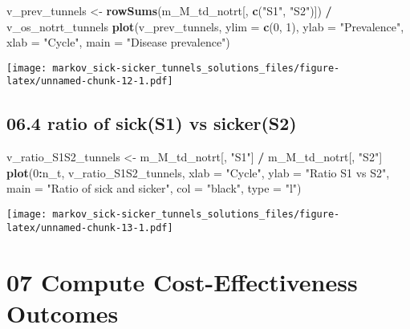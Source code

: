 \documentclass[
]{article}
\newenvironment{Shaded}{\begin{snugshade}}{\end{snugshade}}
\newcommand{\DataTypeTok}[1]{\textcolor[rgb]{0.13,0.29,0.53}{#1}}
\newcommand{\DecValTok}[1]{\textcolor[rgb]{0.00,0.00,0.81}{#1}}
\newcommand{\KeywordTok}[1]{\textcolor[rgb]{0.13,0.29,0.53}{\textbf{#1}}}
\newcommand{\NormalTok}[1]{#1}
\newcommand{\OperatorTok}[1]{\textcolor[rgb]{0.81,0.36,0.00}{\textbf{#1}}}
\newcommand{\StringTok}[1]{\textcolor[rgb]{0.31,0.60,0.02}{#1}}
\begin{document}
\begin{Shaded}
\begin{Highlighting}[]
\NormalTok{v_prev_tunnels <-}\StringTok{ }\KeywordTok{rowSums}\NormalTok{(m_M_td_notrt[, }\KeywordTok{c}\NormalTok{(}\StringTok{"S1"}\NormalTok{, }\StringTok{"S2"}\NormalTok{)]) }\OperatorTok{/}\StringTok{ }\NormalTok{v_os_notrt_tunnels}
\KeywordTok{plot}\NormalTok{(v_prev_tunnels,}
     \DataTypeTok{ylim =} \KeywordTok{c}\NormalTok{(}\DecValTok{0}\NormalTok{, }\DecValTok{1}\NormalTok{),}
     \DataTypeTok{ylab =} \StringTok{"Prevalence"}\NormalTok{,}
     \DataTypeTok{xlab =} \StringTok{"Cycle"}\NormalTok{,}
     \DataTypeTok{main =} \StringTok{"Disease prevalence"}\NormalTok{)}
\end{Highlighting}
\end{Shaded}

\texttt{[image: markov\_sick-sicker\_tunnels\_solutions\_files/figure-latex/unnamed-chunk-12-1.pdf]}

\hypertarget{ratio-of-sicks1-vs-sickers2}{%
\subsection{06.4 ratio of sick(S1) vs
sicker(S2)}\label{ratio-of-sicks1-vs-sickers2}}

\begin{Shaded}
\begin{Highlighting}[]
\NormalTok{v_ratio_S1S2_tunnels <-}\StringTok{ }\NormalTok{m_M_td_notrt[, }\StringTok{"S1"}\NormalTok{] }\OperatorTok{/}\StringTok{ }\NormalTok{m_M_td_notrt[, }\StringTok{"S2"}\NormalTok{]}
\KeywordTok{plot}\NormalTok{(}\DecValTok{0}\OperatorTok{:}\NormalTok{n_t, v_ratio_S1S2_tunnels,}
     \DataTypeTok{xlab =} \StringTok{"Cycle"}\NormalTok{, }
     \DataTypeTok{ylab =} \StringTok{"Ratio S1 vs S2"}\NormalTok{, }
     \DataTypeTok{main =} \StringTok{"Ratio of sick and sicker"}\NormalTok{, }
     \DataTypeTok{col  =} \StringTok{"black"}\NormalTok{, }\DataTypeTok{type =} \StringTok{"l"}\NormalTok{)}
\end{Highlighting}
\end{Shaded}

\texttt{[image: markov\_sick-sicker\_tunnels\_solutions\_files/figure-latex/unnamed-chunk-13-1.pdf]}

\hypertarget{compute-cost-effectiveness-outcomes}{%
\section{07 Compute Cost-Effectiveness
Outcomes}\label{compute-cost-effectiveness-outcomes}}
\end{document}
